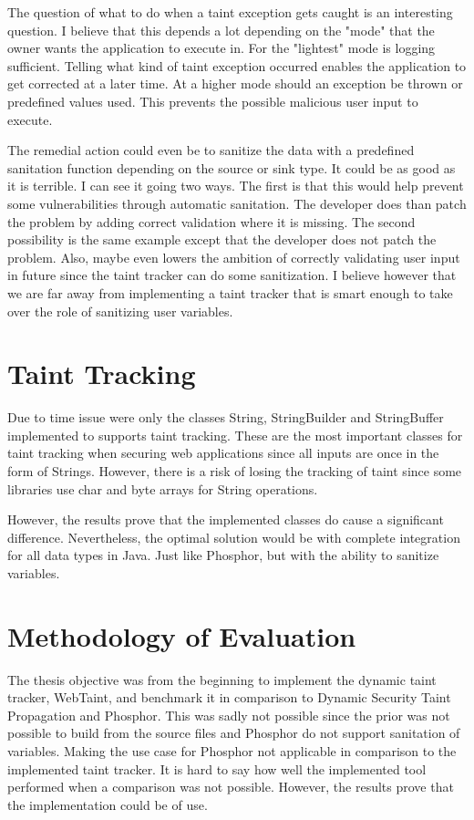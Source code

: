 The question of what to do when a taint exception gets caught is an interesting question. I believe that this depends a lot depending on the "mode" that the owner wants the application to execute in. For the "lightest" mode is logging sufficient. Telling what kind of taint exception occurred enables the application to get corrected at a later time. At a higher mode should an exception be thrown or predefined values used. This prevents the possible malicious user input to execute. 

The remedial action could even be to sanitize the data with a predefined sanitation function depending on the source or sink type. It could be as good as it is terrible. I can see it going two ways. The first is that this would help prevent some vulnerabilities through automatic sanitation. The developer does than patch the problem by adding correct validation where it is missing. The second possibility is the same example except that the developer does not patch the problem. Also, maybe even lowers the ambition of correctly validating user input in future since the taint tracker can do some sanitization. I believe however that we are far away from implementing a taint tracker that is smart enough to take over the role of sanitizing user variables.



\section{Taint Tracking}
\label{propagation}
Due to time issue were only the classes String, StringBuilder and StringBuffer implemented to supports taint tracking. These are the most important classes for taint tracking when securing web applications since all inputs are once in the form of Strings. However, there is a risk of losing the tracking of taint since some libraries use char and byte arrays for String operations.

However, the results prove that the implemented classes do cause a significant difference. Nevertheless, the optimal solution would be with complete integration for all data types in Java. Just like Phosphor, but with the ability to sanitize variables.



\section{Methodology of Evaluation}
\label{methev}
The thesis objective was from the beginning to implement the dynamic taint tracker, WebTaint, and benchmark it in comparison to Dynamic Security Taint Propagation and Phosphor. This was sadly not possible since the prior was not possible to build from the source files and Phosphor do not support sanitation of variables. Making the use case for Phosphor not applicable in comparison to the implemented taint tracker. It is hard to say how well the implemented tool performed when a comparison was not possible. However, the results prove that the implementation could be of use.